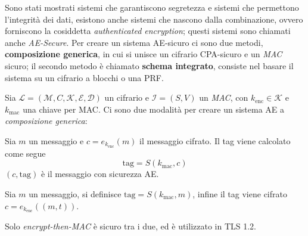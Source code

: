 Sono stati mostrati sistemi che garantiscono segretezza e sistemi che permettono l'integrità dei dati, esistono anche sistemi che nascono dalla combinazione, ovvero forniscono la cosiddetta \emph{authenticated encryption}; questi sistemi sono chiamati anche \emph{AE-Secure}. Per creare un sistema AE-sicuro ci sono due metodi, \textbf{composizione generica}, in cui si unisce un cifrario CPA-sicuro e un \emph{MAC} sicuro; il secondo metodo è chiamato \textbf{schema integrato}, consiste nel basare il sistema su un cifrario a blocchi o una PRF.

Sia $\mathcal{L} = (\mathcal{M}, C, \mathcal{K}, \mathcal{E}, \mathcal{D})$ un cifrario e $\mathcal{I} = (S,V)$ un \emph{MAC}, con $k_{\text{enc}} \in \mathcal{K}$ e $k_{\text{mac}}$ una chiave per MAC.
Ci sono due modalità per creare un sistema AE a \emph{composizione generica}: 
\begin{definition}
    Sia $m$ un messaggio e $c = e_{k_{\text{enc}}}(m)$ il messaggio cifrato. Il tag viene calcolato come segue 
    \[ \text{tag} = S(k_{\text{mac}},c) \]
    $(c,\text{tag})$ è il messaggio con sicurezza AE.
\end{definition}

\begin{definition}
    Sia $m$ un messaggio, si definisce $\text{tag} = S(k_{\text{mac}},m)$, infine il tag viene cifrato $c = e_{k_{\text{enc}}}((m,t))$.
\end{definition}
\noindent
Solo \emph{encrypt-then-MAC} è sicuro tra i due, ed è utilizzato in TLS 1.2. 

